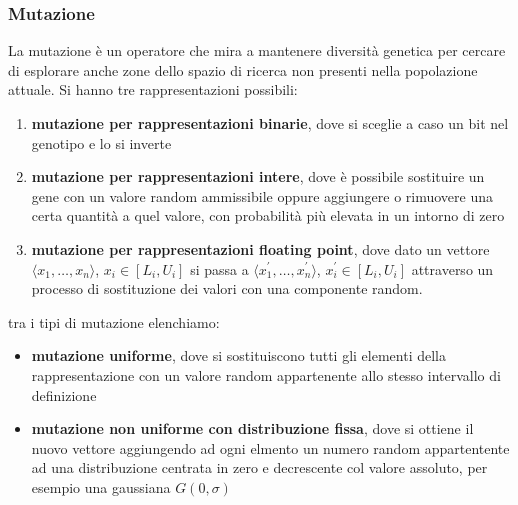 \documentclass[a4paper,12pt, oneside]{book}
\begin{document}
\subsubsection{Mutazione}
La mutazione è un operatore che mira a mantenere diversità genetica
per cercare di esplorare anche zone dello spazio di ricerca non
presenti nella popolazione attuale. Si hanno tre rappresentazioni
possibili:
\begin{enumerate}
  \item \textbf{mutazione per rappresentazioni binarie}, dove si
  sceglie a caso un bit nel genotipo e lo si inverte
  \item \textbf{mutazione per rappresentazioni intere}, dove è
  possibile sostituire un gene con un valore random ammissibile oppure
  aggiungere o rimuovere una certa quantità a quel valore, con
  probabilità più elevata in un intorno di zero
  \item \textbf{mutazione per rappresentazioni floating point}, dove
  dato un vettore $\langle x_1,\ldots,x_n\rangle$, $x_i\in[L_i,U_i]$
  si passa a $\langle x^{'}_1,\ldots,x^{'}_n\rangle$,
  $x^{'}_i\in[L_i,U_i]$ attraverso un processo di sostituzione dei
  valori con una componente random.
\end{enumerate}
tra i tipi di mutazione elenchiamo:
\begin{itemize}
  \item \textbf{mutazione uniforme}, dove si sostituiscono tutti gli
  elementi della rappresentazione con un valore random appartenente
  allo stesso intervallo di definizione
  \item \textbf{mutazione non uniforme con distribuzione fissa}, dove
  si ottiene il nuovo vettore aggiungendo ad ogni elmento un numero
  random appartentente ad una distribuzione centrata in zero e
  decrescente col valore assoluto, per esempio una gaussiana
  $G(0,\sigma)$ 
\end{itemize}
\end{document}
